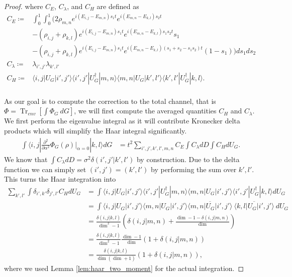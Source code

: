\documentclass{article}
\newcommand{\ket}[1]{|#1\rangle}
\newcommand{\bra}[1]{\langle #1|}
\newcommand{\parens}[1]{\left( #1 \right)}
\newcommand{\brackets}[1]{\left[ #1 \right]}
\DeclareMathOperator{\Tr}{Tr}
\newcommand{\partrace}[2]{\Tr_{#1} \brackets{ #2 }}
\begin{document}
\begin{proof}
where $C_E$, $C_{\lambda}$, and $C_{H}$ are defined as
\begin{align}
    C_E \coloneqq& \int_0^1 \int_0^1 \bigg(  2 \rho_{m,n} e^{i(E_{i,j} - E_{m,n})s_1t} e^{i(E_{m,n} - E_{k,l})s_2 t}  \\
    &- (\rho_{i,j} + \rho_{k,l}) e^{i(E_{i,j} - E_{m,n})s_1 t} e^{i(E_{m,n} - E_{k,l})s_1 s_2 t} s_1 \\
    &- (\rho_{i,j} + \rho_{k,l}) e^{i(E_{i,j} - E_{m,n})s_1 t} e^{i(E_{m,n} - E_{k,l})(s_1 + s_2 - s_1 s_2)t} (1-s_1) \bigg) ds_1 ds_2 \\
    C_{\lambda} \coloneqq& \lambda_{i',j'} \lambda_{k',l'} \\
    C_H \coloneqq& \bra{i,j} U_G \ket{i',j'} \bra{i',j'} U_G^\dagger \ket{m,n} \bra{m,n} U_G \ket{k',l'} \bra{k',l'} U_G^\dagger \ket{k,l}. \\
\end{align} 

As our goal is to compute the correction to the total channel, that is $\Phi = \partrace{env}{\int \Phi_G ~dG}$, we will first compute the averaged quantities $C_H$ and $C_\lambda$. We first perform the eigenvalue integral as it will contribute Kronecker delta products which will simplify the Haar integral significantly. 
\begin{align}
    \int \bra{i,j} \frac{\partial^2}{\partial \alpha^2} \Phi_G(\rho) \bigg|_{\alpha = 0} \ket{k,l} dG &= t^2 \sum_{i',j',k',l',m,n} C_E \int C_{\lambda} dD \int C_{H} dU_G. \label{eq:second_order_alpha_factored}
\end{align}
We know that $\int C_{\lambda} dD = \sigma^2 \delta(i',j' | k',l')$ by construction. Due to the delta function we can simply set $(i',j') = (k',l')$ by performing the sum over $k',l'$. This turns the Haar integration into
\begin{align}
    \sum_{k', l'} \int \delta_{i', k'} \delta_{j', l'} C_{H} dU_G &= \int \bra{i,j} U_G \ket{i',j'} \bra{i',j'} U_G^\dagger \ket{m,n} \bra{m,n} U_G \ket{i',j'} \bra{i',j'} U_G^\dagger \ket{k,l} dU_G \\
    &= \int \bra{i,j} U_G \ket{i',j'}  \bra{m,n} U_G \ket{i',j'} \overline{\bra{m,n} U_G \ket{i',j'}} ~ \overline{ \bra{k,l} U_G \ket{i',j'} }~ dU_G \\
    &= \frac{\delta(i,j | k,l)}{\dim^2 - 1} \parens{\delta(i,j | m,n) + \frac{\dim - 1 - \delta(i,j | m,n)}{\dim}} \\
    &= \frac{\delta(i,j | k,l)}{\dim^2 - 1} \frac{\dim - 1}{\dim} \parens{1 + \delta(i,j | m,n)} \\
    &= \frac{\delta(i, j | k,l)}{\dim (\dim + 1)} (1 + \delta(i,j | m,n)),
\end{align}
where we used Lemma \ref{lem:haar_two_moment} for the actual integration.


\end{proof}
\end{document}
